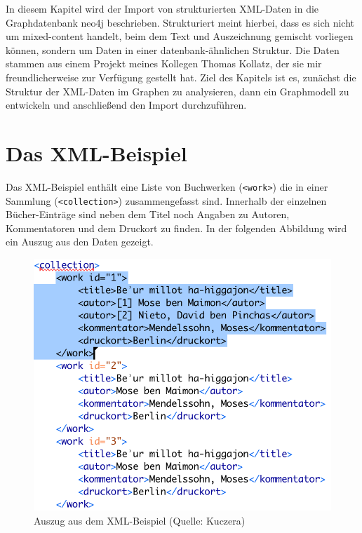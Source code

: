 \documentclass[ngerman,]{scrreprt}
\begin{document}
In diesem Kapitel wird der Import von strukturierten XML-Daten in die Graphdatenbank neo4j beschrieben. Strukturiert meint hierbei, dass es sich nicht um mixed-content handelt, beim dem Text und Auszeichnung gemischt vorliegen können, sondern um Daten in einer datenbank-ähnlichen Struktur. Die Daten stammen aus einem Projekt meines Kollegen Thomas Kollatz, der sie mir freundlicherweise zur Verfügung gestellt hat. Ziel des Kapitels ist es, zunächst die Struktur der XML-Daten im Graphen zu analysieren, dann ein Graphmodell zu entwickeln und anschließend den Import durchzuführen.

\section{Das XML-Beispiel}\label{das-xml-beispiel}

Das XML-Beispiel enthält eine Liste von Buchwerken (\texttt{\textless{}work\textgreater{}}) die in einer Sammlung (\texttt{\textless{}collection\textgreater{}}) zusammengefasst sind. Innerhalb der einzelnen Bücher-Einträge sind neben dem Titel noch Angaben zu Autoren, Kommentatoren und dem Druckort zu finden. In der folgenden Abbildung wird ein Auszug aus den Daten gezeigt.

\begin{figure}
\centering
\includegraphics{./Bilder/kollatz-xml-Beispiel.png}
\caption{Auszug aus dem XML-Beispiel (Quelle: Kuczera)}
\end{figure}
\end{document}
